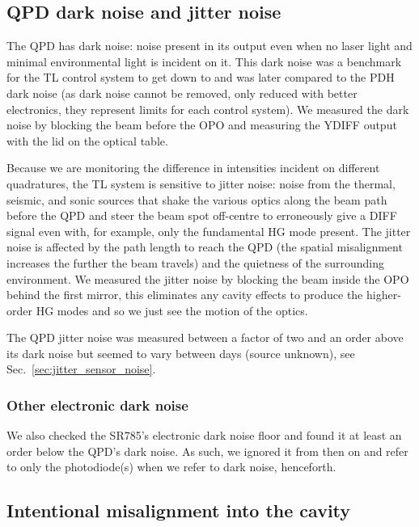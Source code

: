 \documentclass[aps,pra,superscriptaddress,reprint,nofootinbib]{revtex4-1}
\begin{document}
\subsection{QPD dark noise and jitter noise}

The QPD has dark noise: noise present in its output even when no laser light and minimal environmental light is incident on it. This dark noise was a benchmark for the TL control system to get down to and was later compared to the PDH dark noise (as dark noise cannot be removed, only reduced with better electronics, they represent limits for each control system). We measured the dark noise by blocking the beam before the OPO and measuring the YDIFF output with the lid on the optical table.

Because we are monitoring the difference in intensities incident on different quadratures, the TL system is sensitive to jitter noise: noise from the thermal, seismic, and sonic sources that shake the various optics along the beam path before the QPD and steer the beam spot off-centre to erroneously give a DIFF signal even with, for example, only the fundamental HG mode present. The jitter noise is affected by the path length to reach the QPD (the spatial misalignment increases the further the beam travels) and the quietness of the surrounding environment. We measured the jitter noise by blocking the beam inside the OPO behind the first mirror, this eliminates any cavity effects to produce the higher-order HG modes and so we just see the motion of the optics.

The QPD jitter noise was measured between a factor of two and an order above its dark noise but seemed to vary between days (source unknown), see Sec.~\ref{sec:jitter_sensor_noise}.

\subsubsection{Other electronic dark noise}

We also checked the SR785’s electronic dark noise floor and found it at least an order below the QPD’s dark noise. As such, we ignored it from then on and refer to only the photodiode(s) when we refer to dark noise, henceforth.

\subsection{Intentional misalignment into the cavity}
\label{sec:misalignment}
\end{document}
